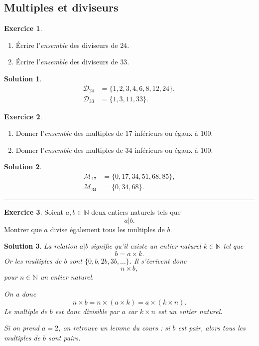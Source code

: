 \documentclass[a4paper, 14pt]{extarticle}
\theoremstyle{plain}
\newtheorem*{sol}{Solution}
\theoremstyle{definition}
\newtheorem{ex}{Exercice}
\newcommand{\N}{\mathbb{N}}
\newif\ifsolutions
\newcommand{\exe}[2]{
		\begin{ex} #1  \end{ex}
		\begin{sol} #2 \end{sol}
	}
\newcommand{\exe}[2]{
		\begin{ex} #1  \end{ex}
	}
\begin{document}
\pagestyle{fancy}
\fancyhead[C]{\textbf{ \ifsolutions Solutions 1 \else Exercices 1 \fi}}
\fancyhead[R]{\today}



\subsection*{Multiples et diviseurs}

\exe{
	\begin{enumerate}
		\item Écrire  l'\emph{ensemble} des diviseurs de $24$.
		\item Écrire  l'\emph{ensemble} des diviseurs de  $33$.
	\end{enumerate}
}{
	\begin{align*}
		\mathcal{D}_{24}& = \{ 1, 2, 3, 4,  6, 8, 12, 24 \}, \\
		\mathcal{D}_{33} &= \{ 1, 3, 11, 33 \}.
	\end{align*}
}


\exe{
	\begin{enumerate}
		\item Donner  l'\emph{ensemble} des multiples de $17$ inférieurs ou égaux à $100$.
		\item Donner  l'\emph{ensemble} des multiples de  $34$ inférieurs ou égaux à $100$.
	\end{enumerate}
}{
	\begin{align*}
		\mathcal{M}_{17}& = \{ 0, 17, 34, 51, 68, 85 \}, \\
		\mathcal{M}_{34} &= \{  0, 34, 68  \}.
	\end{align*}
}

\hrule

\exe{
	Soient $a, b \in \N$ deux entiers naturels tels que
		\[ a | b. \]
	Montrer que $a$ divise également tous les multiples de $b$.
}{
	La relation $a | b$ signifie qu'il existe un entier naturel $k\in\N$ tel que 
		\[ b = a \times k. \]
	Or les multiples de $b$ sont $\{ 0, b, 2b, 3b, \dots \}$. Il s'écrivent donc 
		\[  n \times b, \]
	pour $n \in \N$ un entier naturel.
	
	On a donc 
		\[ n \times b  = n \times (a \times k) = a \times  (k \times n). \]
	Le multiple de $b$ est donc divisible par $a$ car $k \times n$ est un entier naturel.

	Si on prend $a = 2$, on retrouve un lemme du cours : si $b$ est pair, alors tous les multiples de $b$ sont pairs.
}
\end{document}
